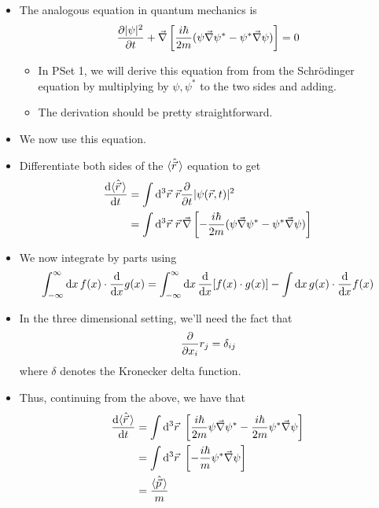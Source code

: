 \documentclass[../notes.tex]{subfiles}
\begin{document}
\begin{itemize}
\begin{itemize}
        \item The analogous equation in quantum mechanics is
        \begin{equation*}
            \pdv{|\psi|^2}{t}+\vec{\nabla}\left[ \frac{i\hbar}{2m}(\psi\vec{\nabla}\psi^*-\psi^*\vec{\nabla}\psi) \right] = 0
        \end{equation*}
        \begin{itemize}
            \item In PSet 1, we will derive this equation from from the Schr\"{o}dinger equation by multiplying by $\psi,\psi^*$ to the two sides and adding.
            \item The derivation should be pretty straightforward.
        \end{itemize}
        \item We now use this equation.
        \item Differentiate both sides of the $\langle{\hat{\vec{r}}}\,\rangle$ equation to get
        \begin{align*}
            \dv{\Exp{\hat{\vec{r}}}}{t} &= \int\dd^3\vec{r}\ \vec{r}\pdv{t}|\psi(\vec{r},t)|^2\\
            &= \int\dd^3\vec{r}\ \vec{r}\,\vec{\nabla}\left[ -\frac{i\hbar}{2m}(\psi\vec{\nabla}\psi^*-\psi^*\vec{\nabla}\psi) \right]
        \end{align*}
        \item We now integrate by parts using
        \begin{equation*}
            \int_{-\infty}^\infty\dd{x}f(x)\cdot\dv{x}g(x) = \int_{-\infty}^\infty\dd{x}\dv{x}[f(x)\cdot g(x)]-\int\dd{x}g(x)\cdot\dv{x}f(x)
        \end{equation*}
        \item In the three dimensional setting, we'll need the fact that
        \begin{equation*}
            \pdv{x_i}r_j = \delta_{ij}
        \end{equation*}
        where $\delta$ denotes the Kronecker delta function.
        \item Thus, continuing from the above, we have that
        \begin{align*}
            \dv{\Exp{\hat{\vec{r}}}}{t} &= \int\dd^3\vec{r}\ \left[ \frac{i\hbar}{2m}\psi\vec{\nabla}\psi^*-\frac{i\hbar}{2m}\psi^*\vec{\nabla}\psi \right]\\
            &= \int\dd^3\vec{r}\ \left[ -\frac{i\hbar}{m}\psi^*\vec{\nabla}\psi \right]\\
            &= \frac{\Exp{\hat{\vec{p}}}}{m}

\end{align*}
\end{itemize}
\end{itemize}
\end{document}
